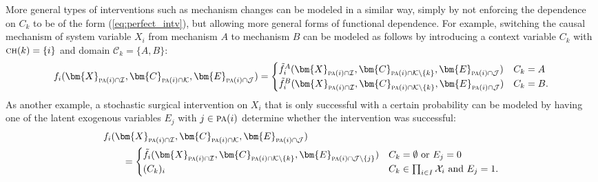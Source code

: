 \documentclass[twoside,11pt]{article}
\newcommand\B[1]{\bm{#1}}
\newcommand\C[1]{\mathcal{#1}}
\newcommand\mathbfsc[1]{\text{\normalfont\scshape#1}}
\newcommand\pa[1]{\mathbfsc{pa}(#1)}
\newcommand\ch[1]{\mathbfsc{ch}(#1)}
\newcommand\eref[1]{(\ref{#1})}
\begin{document}
More general types of interventions such as mechanism changes \citep{TianPearl2001} can be modeled in a similar way, 
simply by not enforcing the dependence on $C_k$ to be of the form \eref{eq:perfect_intv}, but allowing more general
forms of functional dependence. For example, switching the causal mechanism of system
variable $X_i$ from mechanism $A$ to mechanism $B$ can be modeled as follows by introducing a context variable $C_k$ with $\ch{k} = \{i\}$ and domain $\C{C}_k = \{A,B\}$:
\begin{equation}\label{eq:mechanism_change}
  f_i( \B{X}_{\pa{i} \cap \C{I}}, \B{C}_{\pa{i} \cap \C{K}}, \B{E}_{\pa{i} \cap \C{J}}) =
  \begin{cases}
    \tilde f_i^{A}( \B{X}_{\pa{i} \cap \C{I}}, \B{C}_{\pa{i} \cap \C{K} \setminus \{k\}}, \B{E}_{\pa{i} \cap \C{J}}) & C_k = A \\
    \tilde f_i^{B}( \B{X}_{\pa{i} \cap \C{I}}, \B{C}_{\pa{i} \cap \C{K} \setminus \{k\}}, \B{E}_{\pa{i} \cap \C{J}}) & C_k = B. \\
  \end{cases}
\end{equation}
As another example, a stochastic surgical intervention on $X_i$ that is only successful with a certain probability can be 
modeled by having one of the latent exogenous variables $E_j$ with $j \in \pa{i}$ determine whether the intervention was 
successful:
\begin{equation}\label{eq:perfect_intv_stochastic}\begin{split}
  & f_i( \B{X}_{\pa{i} \cap \C{I}}, \B{C}_{\pa{i} \cap \C{K}}, \B{E}_{\pa{i} \cap \C{J}}) \\
  & \qquad = \begin{cases}
    \tilde f_i( \B{X}_{\pa{i} \cap \C{I}}, \B{C}_{\pa{i} \cap \C{K} \setminus \{k\}}, \B{E}_{\pa{i} \cap \C{J} \setminus \{j\}}) & C_k = \emptyset \text{ or } E_j = 0 \\
    (C_k)_i & C_k \in \prod_{i\in I} \C{X}_i \text{ and } E_j = 1.
  \end{cases}
\end{split}\end{equation}
\end{document}
